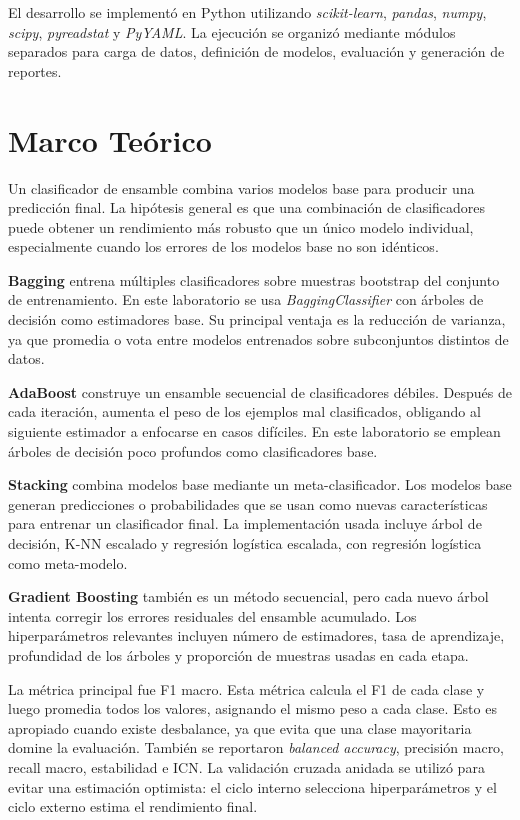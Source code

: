 \documentclass[conference]{IEEEtran}
\begin{document}
El desarrollo se implementó en Python utilizando \textit{scikit-learn}, \textit{pandas}, \textit{numpy}, \textit{scipy}, \textit{pyreadstat} y \textit{PyYAML}. La ejecución se organizó mediante módulos separados para carga de datos, definición de modelos, evaluación y generación de reportes.

\section{Marco Teórico}
Un clasificador de ensamble combina varios modelos base para producir una predicción final. La hipótesis general es que una combinación de clasificadores puede obtener un rendimiento más robusto que un único modelo individual, especialmente cuando los errores de los modelos base no son idénticos.

\textbf{Bagging} entrena múltiples clasificadores sobre muestras bootstrap del conjunto de entrenamiento. En este laboratorio se usa \textit{BaggingClassifier} con árboles de decisión como estimadores base. Su principal ventaja es la reducción de varianza, ya que promedia o vota entre modelos entrenados sobre subconjuntos distintos de datos.

\textbf{AdaBoost} construye un ensamble secuencial de clasificadores débiles. Después de cada iteración, aumenta el peso de los ejemplos mal clasificados, obligando al siguiente estimador a enfocarse en casos difíciles. En este laboratorio se emplean árboles de decisión poco profundos como clasificadores base.

\textbf{Stacking} combina modelos base mediante un meta-clasificador. Los modelos base generan predicciones o probabilidades que se usan como nuevas características para entrenar un clasificador final. La implementación usada incluye árbol de decisión, K-NN escalado y regresión logística escalada, con regresión logística como meta-modelo.

\textbf{Gradient Boosting} también es un método secuencial, pero cada nuevo árbol intenta corregir los errores residuales del ensamble acumulado. Los hiperparámetros relevantes incluyen número de estimadores, tasa de aprendizaje, profundidad de los árboles y proporción de muestras usadas en cada etapa.

La métrica principal fue F1 macro. Esta métrica calcula el F1 de cada clase y luego promedia todos los valores, asignando el mismo peso a cada clase. Esto es apropiado cuando existe desbalance, ya que evita que una clase mayoritaria domine la evaluación. También se reportaron \textit{balanced accuracy}, precisión macro, recall macro, estabilidad e ICN. La validación cruzada anidada se utilizó para evitar una estimación optimista: el ciclo interno selecciona hiperparámetros y el ciclo externo estima el rendimiento final.
\end{document}
